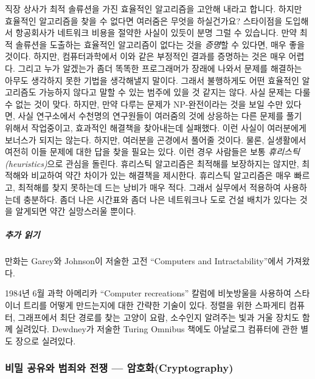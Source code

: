 \documentclass[]{article}
\begin{document}
직장 상사가 최적 솔류션을 가진 효율적인 알고리즘을 고안해 내라고 합니다.
하지만 효율적인 알고리즘을 찾을 수 없다면 여러줌은 무엇을 하실건가요?
스타이점을 도입해서 항공회사가 네트워크 비용을 절약한 사실이 있듯이 분명
그럴 수 있습니다. 만약 최적 솔류션을 도출하는 효율적인 알고리즘이 없다는
것을 \emph{증명}할 수 있다면, 매우 좋을 것이다. 하지만, 컴퓨터과학에서
이와 같은 부정적인 결과를 증명하는 것은 매우 어렵다. 그리고 누가
알겠는가 좀더 똑똑한 프로그래머가 장래에 나와서 문제를 해결하는 아무도
생각하지 못한 기법을 생각해낼지 말이다. 그래서 불행하게도 어떤 효율적인
알고리즘도 가능하지 않다고 말할 수 있는 범주에 있을 것 같지는 않다. 사실
문제는 다룰 수 없는 것이 맞다. 하지만, 만약 다루는 문제가 NP-완전이라는
것을 보일 수만 있다면, 사실 연구소에서 수천명의 연구원들이 여러줌의 것에
상응하는 다른 문제를 풀기 위해서 작업중이고, 효과적인 해결책을
찾아내는데 실패했다. 이런 사실이 여러분에게 보너스가 되지는 않는다.
하지만, 여러분을 곤경에서 풀어줄 것이다. 물론, 실생활에서 여전히 이들
문제에 대한 답을 찾을 필요는 있다. 이런 경우 사람들은 보통
\emph{휴리스틱(heuristics)}으로 관심을 돌린다. 휴리스틱 알고리즘은
최적해를 보장하지는 않지만, 최적해와 비교하여 약간 차이가 있는 해결책을
제시한다. 휴리스틱 알고리즘은 매우 빠르고, 최적해를 찾지 못하는데 드는
낭비가 매우 적다. 그래서 실무에서 적용하여 사용하는데 충분하다. 좀더
나은 시간표와 좀더 나은 네트워크나 도로 건설 배치가 있다는 것을 알게되면
약간 실망스러울 뿐이다.

\subparagraph{추가 읽기}\label{section-221}

만화는 Garey와 Johnson이 저술한 고전 ``Computers and
Intractability''에서 가져왔다.

1984년 6월 과학 아메리카 ``Computer recreations'' 칼럼에 비눗방울을
사용하여 스타이너 트리를 어떻게 만드는지에 대한 간략한 기술이 있다.
정렬을 위한 스파게티 컴퓨터, 그래프에서 최단 경로를 찾는 고양이 요람,
소수인지 알려주는 빛과 거울 장치도 함께 실려있다. Dewdney가 저술한
Turing Omnibus 책에도 아날로그 컴퓨터에 관한 별도 장으로 실려있다.


\subsubsection{비밀 공유와 범죄와 전쟁 ---
암호화(Cryptography)}\label{mdash-cryptography}
\end{document}
